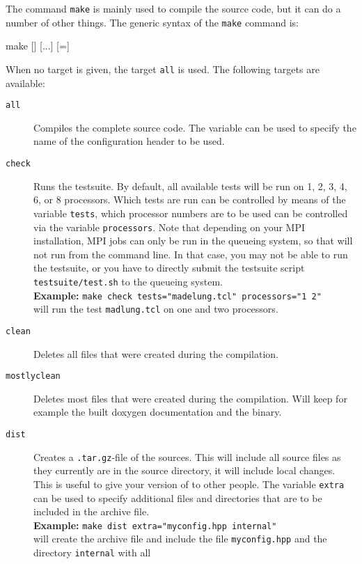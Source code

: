 The command \texttt{make} is mainly used to compile the \es source
code, but it can do a number of other things. The generic syntax of
the \texttt{make} command is:
\begin{code}
make [] [...] [=]
\end{code}
When no target is given, the target \texttt{all} is used. The
following targets are available:
\begin{description}
\item[\texttt{all}] Compiles the complete \es source code. The
  variable  can be used to specify the name of the
  configuration header to be used.
\item[\texttt{check}] Runs the testsuite. By default, all available
  tests will be run on 1, 2, 3, 4, 6, or 8 processors. Which tests are
  run can be controlled by means of the variable \texttt{tests}, which
  processor numbers are to be used can be controlled via the variable
  \texttt{processors}. Note that depending on your MPI installation,
  MPI jobs can only be run in the queueing system, so that \es{} will
  not run from the command line. In that case, you may not be able to
  run the testsuite, or you have to directly submit the testsuite script
  \verb!testsuite/test.sh! to the queueing system.\\
  \textbf{Example:} \verb!make check tests="madelung.tcl" processors="1 2"!\\
  will run the test \texttt{madlung.tcl} on one and two processors.
\item[\texttt{clean}] Deletes all files that were created during the
  compilation.
\item[\texttt{mostlyclean}] Deletes most files that were created
  during the compilation. Will keep for example the built doxygen
  documentation and the \es{} binary.
\item[\texttt{dist}] Creates a \texttt{.tar.gz}-file of the \es{}
  sources.  This will include all source files as they currently are
  in the source directory, \ie{} it will include local changes.  This
  is useful to give your version of \es{} to other people.
  The variable \texttt{extra} can be used to specify additional
  files and directories that are to be included in the archive
  file. \\
  \textbf{Example:} \verb!make dist extra="myconfig.hpp internal"!\\
  will create the archive file and include the file
  \texttt{myconfig.hpp} and the directory \texttt{internal} with all

\end{description}
